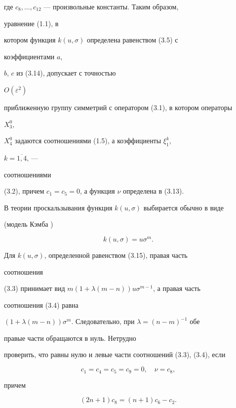 где $c_8,\dotsc,c_{12}$ --- произвольные константы. Таким образом,


уравнение (1.1), в


котором функция $k(u,\sigma)$ определена равенством (3.5) с


коэффициентами $a$,


$b$, $c$ из (3.14), допускает с точностью


$O(\varepsilon^2)$


приближенную группу симметрий с оператором (3.1), в котором операторы


$X^0_3$,


$X^0_4$ задаются соотношениями (1.5), а коэффициенты $\xi^k_1$,


$k=\overline{1,4}$, ---


соотношениями


(3.2), причем $c_1=c_5=0$, а функция $\nu$ определена в (3.13).





В теории проскальзывания функция $k(u,\sigma)$ выбирается обычно в виде


(модель Кэмба \cite{Kamb})


\begin{equation}


k(u,\sigma)=u\sigma^m.\tag{3.15}


\end{equation}


Для $k(u,\sigma)$, определенной равенством (3.15), правая часть


соотношения


(3.3) принимает вид $m(1+\lambda(m-n))u\sigma^{m-1}$, а правая часть


соотношения (3.4) равна


$(1+\lambda(m-n))\sigma^m$. Следовательно, при $\lambda=(n-m)^{-1}$ обе


правые части обращаются в нуль. Нетрудно


проверить, что равны нулю и левые части соотношений (3.3), (3.4), если


\begin{equation}


c_1=c_4=c_5=c_9=0,\quad \nu=c_8,\tag{3.16}


\end{equation}


причем


\begin{equation}


(2n+1)c_8=(n+1)c_6-c_2.\tag{3.17}


\end{equation}


